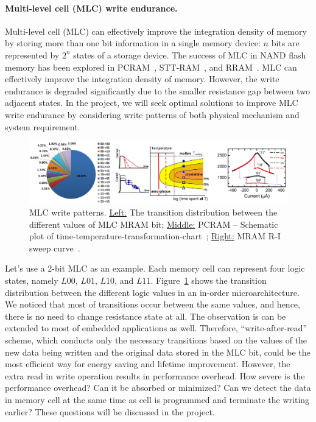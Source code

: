 \paragraph{Multi-level cell (MLC) write endurance.} Multi-level cell (MLC) can effectively improve the integration density of memory by storing more than one bit information in a single memory device: $n$ bits are represented by  $2^n$ states of a storage device. The success of MLC in NAND flash memory has been explored in PCRAM~\cite{Raoux08,Bedeschi09}, STT-RAM~\cite{Lou08}, and RRAM~\cite{Baek05}. MLC can effectively improve the integration density of memory. However, the write endurance is degraded significantly due to the smaller resistance gap between two adjacent states. In the project, we will seek optimal solutions to improve MLC write endurance by considering write patterns of both physical mechanism and system requirement.

\begin{figure}
\centering
\vspace{-10pt}
\includegraphics[width=1.0\textwidth]{./figure/4_mlc.pdf}
\vspace{-10pt}
\caption{MLC write patterns. \underline{Left:} The transition distribution between the different values of MLC MRAM bit; \underline{Middle:} PCRAM -- Schematic plot of time-temperature-transformation-chart~\cite{Nirschl07}; \underline{Right:} MRAM R-I sweep curve~\cite{Lou08}.}
\label{mlc}
\vspace{-10pt}
\end{figure}

Let's use a 2-bit MLC as an example. Each memory cell can represent four logic states, namely $L00$, $L01$, $L10$, and $L11$.  Figure~\ref{mlc} shows the transition distribution between the different logic values in an in-order microarchitecture. We noticed that most of transitions occur between the same values, and hence, there is no need to change resistance state at all. The observation is can be extended to most of embedded applications as well. Therefore, ``write-after-read'' scheme, which conducts only the necessary transitions based on the values of the new data being written and the original data stored in the MLC bit, could be the most efficient way for energy saving and lifetime improvement. However, the extra read in write operation results in performance overhead. How severe is the performance overhead? Can it be absorbed or minimized? Can we detect the data in memory cell at the same time as cell is programmed and terminate the writing earlier? These questions will be discussed in the project.

